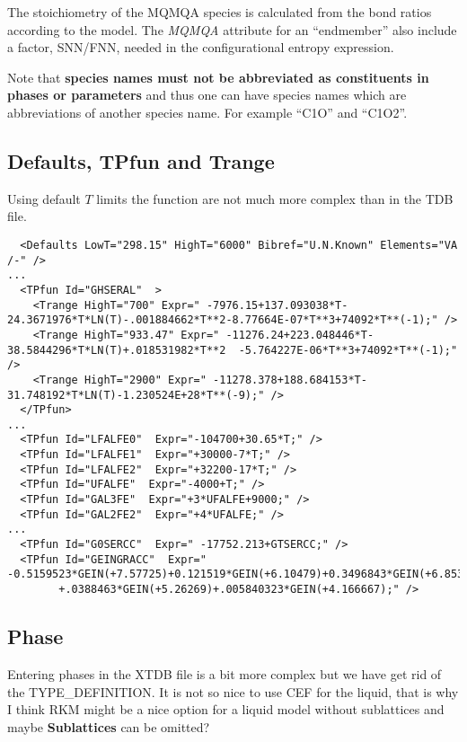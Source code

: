 \documentclass{article}
\begin{document}
\begin{appendices}
The stoichiometry of the MQMQA species is calculated from the bond
ratios according to the model.  The {\em MQMQA} attribute for an
``endmember'' also include a factor, SNN/FNN, needed in the
configurational entropy expression.

Note that {\bf species names must not be abbreviated as constituents in
  phases or parameters} and thus one can have species names which are
abbreviations of another species name.  For example ``C1O'' and
``C1O2''.

\newpage 

\subsection{Defaults, TPfun and Trange}\label{sec:tpfuns}

Using default $T$ limits the function are not much more complex than
in the TDB file.

{\small
\begin{verbatim}
  <Defaults LowT="298.15" HighT="6000" Bibref="U.N.Known" Elements="VA /-" />
...
  <TPfun Id="GHSERAL"  >
    <Trange HighT="700" Expr=" -7976.15+137.093038*T-24.3671976*T*LN(T)-.001884662*T**2-8.77664E-07*T**3+74092*T**(-1);" />
    <Trange HighT="933.47" Expr=" -11276.24+223.048446*T-38.5844296*T*LN(T)+.018531982*T**2  -5.764227E-06*T**3+74092*T**(-1);" />
    <Trange HighT="2900" Expr=" -11278.378+188.684153*T-31.748192*T*LN(T)-1.230524E+28*T**(-9);" />
  </TPfun>
...
  <TPfun Id="LFALFE0"  Expr="-104700+30.65*T;" />
  <TPfun Id="LFALFE1"  Expr="+30000-7*T;" />
  <TPfun Id="LFALFE2"  Expr="+32200-17*T;" />
  <TPfun Id="UFALFE"  Expr="-4000+T;" />
  <TPfun Id="GAL3FE"  Expr="+3*UFALFE+9000;" />
  <TPfun Id="GAL2FE2"  Expr="+4*UFALFE;" />
...
  <TPfun Id="G0SERCC"  Expr=" -17752.213+GTSERCC;" /> 
  <TPfun Id="GEINGRACC"  Expr=" -0.5159523*GEIN(+7.57725)+0.121519*GEIN(+6.10479)+0.3496843*GEIN(+6.8533)
        +.0388463*GEIN(+5.26269)+.005840323*GEIN(+4.166667);" /> 
\end{verbatim}
}

\newpage 

\subsection{Phase}\label{sec:phase example}

Entering phases in the XTDB file is a bit more complex but we have get
rid of the TYPE\_DEFINITION.  It is not so nice to use CEF for the
liquid, that is why I think RKM might be a nice option for a liquid
model without sublattices and maybe {\bf Sublattices} can be omitted?


\end{appendices}
\end{document}

